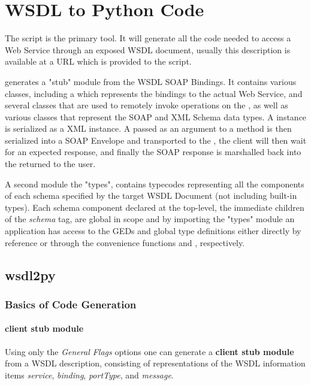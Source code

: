 \chapter{WSDL to Python Code}

The \WPY{} script is the primary tool.  It will generate all the
code needed to access a Web Service through an exposed WSDL document, usually
this description is available at a URL which is provided to the script. 

\WPY{} generates a "stub" module from the WSDL SOAP Bindings.  It contains various
classes, including a  which represents the bindings to the actual
Web Service, and several  classes that are used to remotely invoke 
operations on the \WS{}, as well as various  classes that
represent the SOAP and XML Schema data types.  A  instance is
serialized as a XML instance.  A  passed as an argument to a
 method is then serialized into a SOAP Envelope and transported to the
\WS{}, the client will then wait for an expected response, and finally the SOAP
response is marshalled back into the  returned to the user.

A second module the "types", contains typecodes representing all the components
of each schema specified by the target WSDL Document (not including built-in
types).  Each schema component declared at the top-level, the immediate children
of the \emph{schema} tag, are global in scope and by importing the "types" module
an application has access to the GEDs and global type definitions either
directly by reference or through the convenience functions  and
, respectively.

\section{wsdl2py}

\subsection{Basics of Code Generation}
\label{subsection:Basics of Code Generation}

\subsubsection{client stub module}
Using only the {\it General Flags} options one can generate a 
{\bfseries client stub module} from a WSDL description, consisting of
representations of the WSDL information items {\it service}, {\it binding}, 
{\it portType}, and {\it message}.

